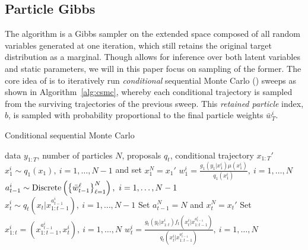 
% 
% 
\subsection{Particle Gibbs}
\label{sec:ipmcmc:background:pg}
The \pg algorithm \citep{andrieuDH2010} is a Gibbs sampler on the extended space composed of all random variables generated at one iteration, which still retains the original target distribution as a marginal. Though \pg allows for inference over both latent variables and static parameters, we will in this paper focus on sampling of the former.  The core idea of \pg is to iteratively run \emph{conditional} sequential Monte Carlo (\csmc) sweeps as shown in Algorithm~\ref{alg:csmc}, whereby each conditional trajectory is sampled from the surviving trajectories of the previous sweep.  This \emph{retained particle} index, $b$, is sampled with probability proportional to the final particle weights $\bar{w}^i_T$. 


\begin{algorithm}[tb]
	\caption{Conditional sequential Monte Carlo}
	\label{alg:csmc}
	\begin{spacing}{1.2}
	\begin{algorithmic}[1]
		 data $y_{1:T}$, number of particles $N$, proposals $q_t$, conditional trajectory $x_{1:T}'$
		\STATE $x_1^i \sim q_1(x_1), ~i=1,\ldots,N-1$ and set $x_1^N = x_1'$
		\STATE $w_1^i = \frac{g_1(y_1|x_1^i) \mu(x_1^i)}{q_1(x_1^i)}, ~i=1,\ldots,N$
		\STATE $a_{t-1}^i \sim \operatorname*{Discrete}\left(\left\{\bar w_{t-1}^\ell\right\}_{\ell=1}^N\right), ~i=1,\ldots,N-1$
		\STATE $x_t^i \sim q_t(x_t | x_{1:t-1}^{a_{t-1}^i}), ~i=1,\ldots,N-1$
		\STATE Set $a_{t-1}^N = N$ and $x_t^N = x_t'$
		\STATE Set $x_{1:t}^i = (x_{1:t-1}^{a_{t-1}^i},x_t^i), ~i=1,\ldots,N$
		\STATE $w_t^i = \frac{g_t(y_t|x_{1:t}^i) f_t(x_t^i | x_{1:t-1}^{a_{t-1}^i})}{q_t(x_t^i|x_{1:t-1}^{a_{t-1}^i})}, ~i=1,\ldots,N$
		\ENDFOR
	\end{algorithmic}
\end{spacing}
\end{algorithm}


